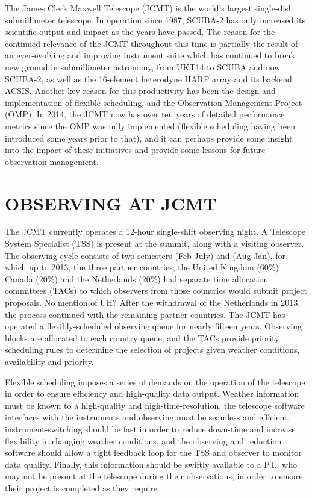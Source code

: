 \documentclass[]{spie}  %
\begin{document}
The James Clerk Maxwell Telescope (JCMT) is the world's largest
single-dish submillimeter telescope. In operation since 1987, SCUBA-2
has only increased its scientific output and impact as the years have
passed. The reason for the continued relevance of the JCMT throughout
this time is partially the result of an ever-evolving and improving
instrument suite which has continued to break new ground in
submillimeter astronomy, from UKT14\cite{1990MNRAS.243..126D} to SCUBA\cite{holland1999}
and now SCUBA-2\cite{holland2013}, as well as the 16-element heterodyne
HARP array\cite{buckle} and its backend ACSIS\cite{2000SPIE.4015..114H}. Another key
reason for this productivity has been the design and implementation of
flexible scheduling\cite{1998SPIE.3349..126W,tilanus2000,robson2002}, and the Observation
Management Project (OMP)\cite{economou2002}.  In 2014, the JCMT now
has over ten years of detailed performance metrics since the OMP was
fully implemented (flexible scheduling having been introduced some
years prior to that), and it can perhaps provide some insight into the
impact of these initiatives and provide some lessons for future
observation management.


\section{OBSERVING AT JCMT}

The JCMT currently operates a 12-hour single-shift observing night. A
Telescope System Specialist (TSS) is present at the summit, along with
a visiting observer. The observing cycle consists of two semesters
(Feb-July) and (Aug-Jan), for which up to 2013, the three partner
countries, the United Kingdom (60$\%$) Canada (20$\%$) and the
Netherlands (20$\%$) had separate time allocation committees (TACs) to
which observers from those countries would submit project
proposals.
{\color{red} No mention of UH?}
After the withdrawal of the Netherlands in 2013, the
process continued with the remaining partner countries. The JCMT has
operated a flexibly-scheduled observing queue for nearly fifteen
years. Observing blocks are allocated to each country queue, and the
TACs provide priority scheduling rules to determine the selection of
projects given weather conditions, availability and priority.

Flexible scheduling imposes a series of demands on the operation of
the telescope in order to ensure efficiency and high-quality data
output. Weather information must be known to a high-quality and
high-time-resolution, the telescope software interfaces with the
instruments and observing must be seamless and efficient,
instrument-switching should be fast in order to reduce down-time and
increase flexibility in changing weather conditions, and the observing
and reduction software should allow a tight feedback loop for the TSS
and observer to monitor data quality. Finally, this information should
be swiftly available to a P.I., who may not be present at the telescope
during their observations, in order to ensure their project is
completed as they require.
\end{document}
